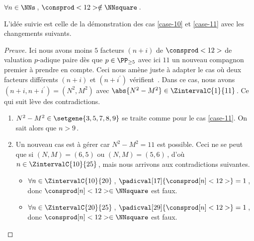 \begin{fact} \label{case-12}
	 $\forall n \in \NNs$\,, $\consprod<12> \notin \NNsquare$\,.
\end{fact}




L'idée suivie est celle de la démonstration des cas \ref{case-10} et \ref{case-11} avec les changements suivants.


\begin{proof}[Preuve]%
    Ici nous avons moins $5$ facteurs $(n + i)$ de $\consprod<12>$ de valuation $p$-adique paire dès que $p \in \PP_{\geq 5}$ avec ici $11$ un nouveau compagnon premier à prendre en compte.
    Ceci nous amène juste à adapter le cas où deux facteurs différents $(n+i)$ et $(n+i^\prime)$ vérifient \,.
    Dans ce cas, nous avons $(n+i, n+i^\prime) = (N^2, M^2)$ avec $\abs{N^2 - M^2} \in \ZintervalC{1}{11}$\,. Ce qui suit lève des contradictions.
	\begin{enumerate}
		\item $N^2 - M^2 \in \setgene{3, 5, 7, 8, 9}$ se traite comme pour le cas \ref{case-11}. On sait alors que $n > 9$\,.

			
		\item Un nouveau cas est à gérer car $N^2 - M^2 = 11$ est possible.
		Ceci ne se peut que si $(N, M) = (6, 5)$ ou $(N, M) = (5, 6)$\,, d'où $n \in \ZintervalC{10}{25}$\,, mais nous arrivons aux contradictions suivantes.
		\begin{itemize}
			\item $\forall n \in \ZintervalC{10}{20}$\,, 
			$\padicval[17]{\consprod[n]<12>} = 1$\,, donc $\consprod[n]<12> \in \NNsquare$ est faux.

			\item $\forall n \in \ZintervalC{20}{25}$\,, 
			$\padicval[29]{\consprod[n]<12>} = 1$\,, donc $\consprod[n]<12> \in \NNsquare$ est faux.
		\qedhere
		\end{itemize}
	\end{enumerate}
\end{proof}

